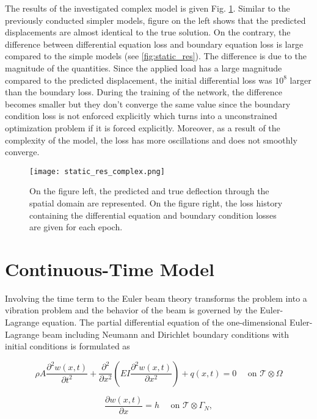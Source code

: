 The results of the investigated complex model is given Fig. \ref{fig:res_complex}. Similar to the previously 
conducted simpler models, 
figure on the left shows that the predicted displacements are almost identical to the true solution. 
On the contrary, the difference between differential equation loss and boundary equation loss is large compared
to the simple models (see \ref{fig:static_res}). The difference is due to the magnitude of the quantities. 
Since the applied load has a large magnitude compared to the predicted displacement, the initial differential loss
was $10^{8}$ larger than the boundary loss. During the training of the network, the difference becomes smaller
but they don't converge the same value since the boundary condition loss is not enforced explicitly which turns
into a unconstrained optimization problem if it is forced explicitly. Moreover, as a result of the complexity of the model, 
the loss has more oscillations and does not smoothly converge. 


\begin{figure}[!ht]
    \centering
    \texttt{[image: static\_res\_complex.png]}  
    \caption{On the figure left, the predicted and true deflection through the
    spatial domain are represented. On the figure right, the
    loss history containing the differential equation and boundary condition losses
    are given for each epoch.}
    \label{fig:res_complex}
\end{figure}


\section{Continuous-Time Model}

Involving the time term to the Euler beam theory transforms the problem into a vibration problem and 
the behavior of the beam is governed by the Euler-Lagrange equation. The partial differential equation
of the one-dimensional Euler-Lagrange beam including Neumann and Dirichlet boundary conditions 
with initial conditions is formulated as 

\begin{equation}
    \label{eq:dynamic_beam_1}
    \rho A \frac{\partial^{2} w(x,t)}{\partial t^{2}} + \frac{\partial^{2}}{\partial x^{2}}\left(E I \frac{\partial^{2} w(x,t)}{\partial x^{2}}\right) + q(x, t) = 0 \quad \text{ on } \mathcal{T} \otimes  \Omega
\end{equation}

\begin{equation}
    \label{eq:dynamic_beam_2}
    \frac{\partial w(x,t)}{\partial x} = h \quad \text { on } \mathcal{T} \otimes \Gamma_{N},
\end{equation}

